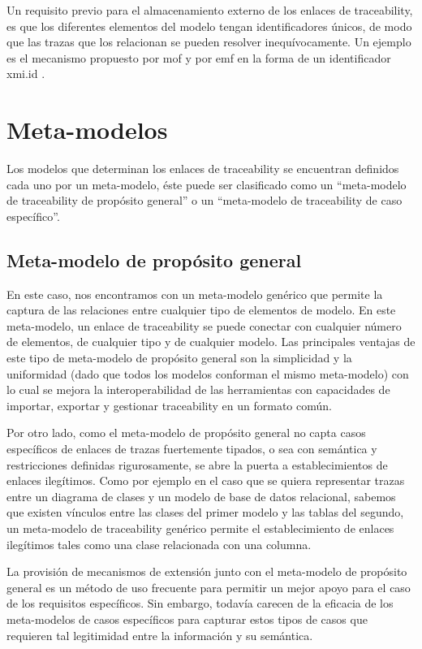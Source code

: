 \documentclass[a4paper,12pt,oneside,spanish]{book}
\begin{document}
Un requisito previo para el almacenamiento externo de los enlaces de traceability, es que los diferentes elementos del modelo tengan identificadores únicos, de modo que las trazas que los relacionan se pueden resolver inequívocamente. Un ejemplo es el mecanismo propuesto por \gls{mof} y por \gls{emf} en la forma de un identificador xmi.id .

\section{Meta-modelos}

Los modelos que determinan los enlaces de traceability se encuentran definidos cada uno por un meta-modelo, éste puede ser clasificado como un “meta-modelo de traceability de propósito general” o un “meta-modelo de traceability de caso específico”.

\subsection{Meta-modelo de propósito general}

En este caso, nos encontramos con un meta-modelo genérico que permite la captura de las relaciones entre cualquier tipo de elementos de modelo. En este meta-modelo, un enlace de traceability se puede conectar con cualquier número de elementos, de cualquier tipo y de cualquier modelo. Las principales ventajas de este tipo de meta-modelo de propósito general son la simplicidad y la uniformidad (dado que todos los modelos conforman el mismo meta-modelo) con lo cual se mejora la interoperabilidad de las herramientas con capacidades de importar, exportar y gestionar traceability en un formato común.

Por otro lado, como el meta-modelo de propósito general no capta casos específicos de enlaces de trazas fuertemente tipados, o sea con semántica y restricciones definidas rigurosamente, se abre la puerta a establecimientos de enlaces ilegítimos. Como por ejemplo en el caso que se quiera representar trazas entre un diagrama de clases y un modelo de base de datos relacional, sabemos que existen vínculos entre las clases del primer modelo y las tablas del segundo, un meta-modelo de traceability genérico permite el establecimiento de enlaces ilegítimos tales como una clase relacionada con una columna.

La provisión de mecanismos de extensión junto con el meta-modelo de propósito general es un método de uso frecuente para permitir un mejor apoyo para el caso de los requisitos específicos. Sin embargo, todavía carecen de la eficacia de los meta-modelos de casos específicos para capturar estos tipos de casos que requieren tal legitimidad entre la información y su semántica.
\end{document}

